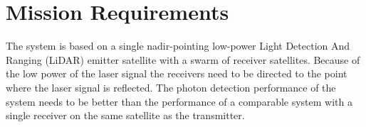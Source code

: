 
\section{Mission Requirements}
\label{dsePPRequirements}
The system is based on a single nadir-pointing low-power Light Detection And Ranging (LiDAR) emitter satellite with a swarm of receiver satellites. Because of the low power of the laser signal the receivers need to be directed to the point where the laser signal is reflected. The photon detection performance of the system needs to be better than the performance of a comparable system with a single receiver on the same satellite as the transmitter.
